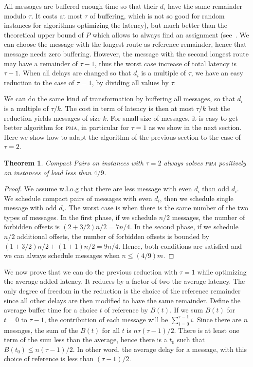 \documentclass[10pt, conference, letterpaper]{IEEEtran}
\newtheorem{theorem}{Theorem}
\newcommand\pma{\textsc{pma}\xspace}
\begin{document}
All messages are buffered enough time so that their $d_i$ have the same
remainder modulo $\tau$. It costs at most $\tau$ of buffering, which is not
so good for random instances for algorithms optimizing the latency), but much better than the theoretical upper bound of $P$ which allows to always find an assignment  (see~\cite{barth2018deterministic}. We can choose the message with the longest route as reference remainder, hence that message needs zero buffering. However, the message with the second longest route may have a remainder of $\tau -1$, thus the worst case increase of total latency is $\tau -1$. When all delays are changed so that $d_i$ is a multiple of $\tau$, we have an easy reduction to the case of $\tau = 1$, by dividing all values by $\tau$.

We can do the same kind of transformation by buffering all 
messages, so that $d_i$ is a multiple of $\tau / k$. The cost in term
of latency is then at most $\tau / k$ but the reduction yields messages of size $k$.
For small size of messages, it is easy to get better algorithm for \pma, in particular for $\tau = 1$ as we show in the next section. Here we show how to adapt the algorithm of the previous section to the case of $\tau = 2$.

\begin{theorem}
Compact Pairs on instances with $\tau =2$ always solves \pma positively on instances of load less than $4/9$.
\end{theorem}
\begin{proof}
We assume w.l.o.g that there are less message with even $d_i$ than odd $d_i$.
We schedule compact pairs of messages with even $d_i$, then we schedule single message with odd $d_i$. The worst case is when there is the same number of the two types of messages. In the first phase, if we schedule
 $n/2$ messages, the number of forbidden offsets is $(2 + 3/2)n/2 = 7n/4$. In the second phase,
 if we schedule $n/2$ additional offsets, the number of forbidden offsets is bounded by 
$ (1 + 3/2) n/2  + (1 + 1)n/2 = 9n/4$.
Hence, both conditions are satisfied and we can always schedule messages when $n \leq (4/9)m$.
\end{proof}


We now prove that we can do the previous reduction with $\tau=1$ while optimizing the average added latency. It reduces by a factor of two the average latency. The only degree of freedom in the reduction is the choice of the reference remainder since all other delays are then modified to have the same remainder.
Define the average buffer time for a choice $t$ of reference by $B(t)$. 
If we sum $B(t)$ for $t=0$ to $\tau-1$, the contribution of each message 
will be $\sum_{i=0}^{\tau-1} i$. Since there are $n$ messages, the sum of the $B(t)$ for all $t$ is $n \tau (\tau-1)/2$. There is at least one term of the sum less than the average,
hence there is a $t_0$ such that $B(t_0) \leq n (\tau-1)/2$. In other word, the average
delay for a message, with this choice of reference is less than $(\tau -1)/2$.
\end{document}
